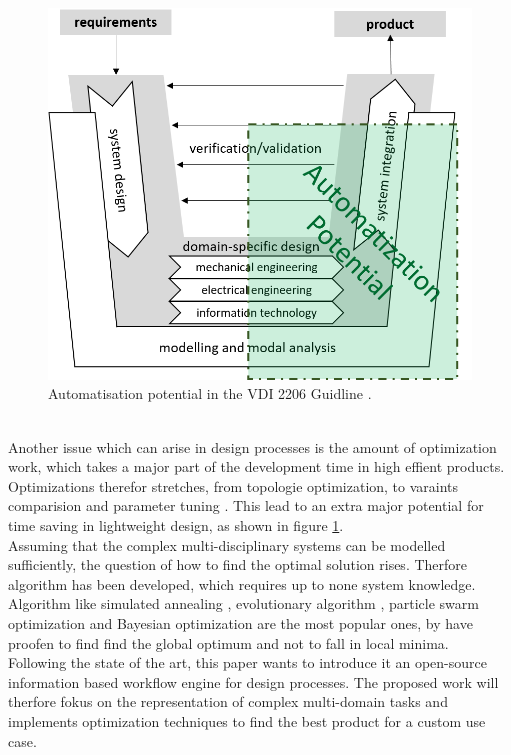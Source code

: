 \begin{figure}[h]
    \centering
    \includegraphics[scale=0.6]{pics/VDI_2206.PNG}
    \caption{\label{pic:VDI2206} Automatisation potential in the VDI 2206 Guidline \cite{Jansch2006THEDO}.}
\end{figure}\\
Another issue which can arise in design processes is the amount of optimization work, which takes a major part of the development time in high effient products.
Optimizations therefor stretches, from topologie optimization, to varaints comparision and parameter tuning \cite{hornby_automated_2006, khalafallah_electimize_2011, evans_aerodynamic_2017, slagter_perform_2020}. 
This lead to an extra major potential for time saving in lightweight design, as shown in figure \ref{pic:VDI2206}.\\
Assuming that the complex multi-disciplinary systems can be modelled sufficiently, the question of how to find the optimal solution rises.
Therfore algorithm has been developed, which requires up to none system knowledge.
Algorithm like simulated annealing \cite{khachaturyan_thermodynamic_1981}, 
evolutionary algorithm \cite{wu_ensemble_2019}, particle swarm optimization \cite{Kennedy1995} and Bayesian optimization \cite{marcuk_optimization_1975}
are the most popular ones, by have proofen to find find the global optimum and not to fall in local minima.\\
Following the state of the art, this paper wants to introduce it an open-source information based workflow engine for design processes.
The proposed work will therfore fokus on the representation of complex multi-domain tasks and implements optimization techniques to find the best product for a custom use case.